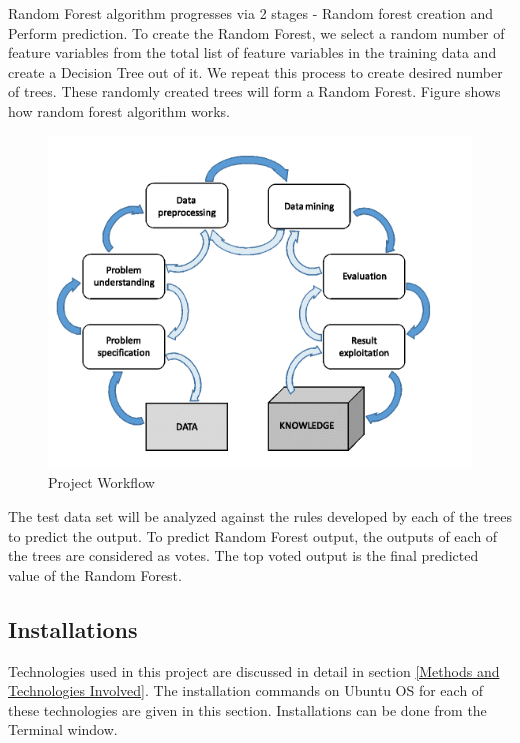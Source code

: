 \documentclass[sigconf]{acmart}
\begin{document}
Random Forest algorithm progresses via 2 stages - Random forest creation and Perform prediction. To create the Random Forest, we select a random number of feature variables from the total list of feature variables in the training data and create a Decision Tree out of it. We repeat this process to create desired number of trees. These randomly created trees will form a Random Forest. Figure shows how random forest algorithm works. 

\begin{figure}[htb]
  \centering
  \includegraphics[width=1.0\columnwidth]{project/images/Figure1.png}
  \caption{Project Workflow
  \cite{preprocessing}}
  \label{fig:Figure1} 
\end{figure}

The test data set will be analyzed against the rules developed by each of the trees to predict the output. To predict Random Forest output, the outputs of each of the trees are considered as votes. The top voted output is the final predicted value of the Random Forest.


\subsection{Installations}

Technologies used in this project are discussed in detail in section \ref{Methods and Technologies Involved}. The installation commands on Ubuntu OS for each of these technologies are given in this section. Installations can be done from the Terminal window. 
\end{document}
